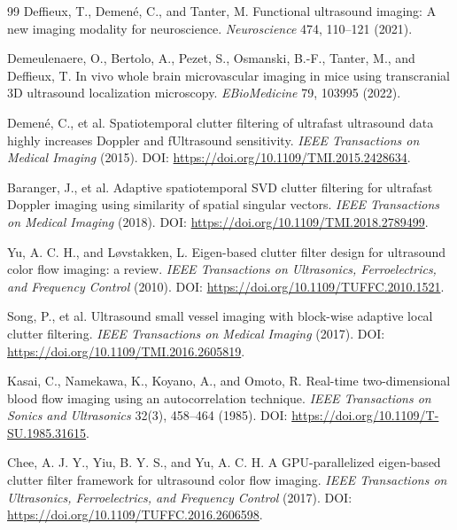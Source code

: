 \documentclass[11pt]{article}
\begin{document}
\begin{thebibliography}{99}
Deffieux, T., Demen{\'e}, C., and Tanter, M.
\newblock Functional ultrasound imaging: A new imaging modality for neuroscience.
\newblock \emph{Neuroscience} 474, 110--121 (2021).

Demeulenaere, O., Bertolo, A., Pezet, S., Osmanski, B.-F., Tanter, M., and Deffieux, T.
\newblock In vivo whole brain microvascular imaging in mice using transcranial 3D ultrasound localization microscopy.
\newblock \emph{EBioMedicine} 79, 103995 (2022).

Demen{\'e}, C., et al.
\newblock Spatiotemporal clutter filtering of ultrafast ultrasound data highly increases Doppler and fUltrasound sensitivity.
\newblock \emph{IEEE Transactions on Medical Imaging} (2015).
\newblock DOI: \url{https://doi.org/10.1109/TMI.2015.2428634}.

Baranger, J., et al.
\newblock Adaptive spatiotemporal SVD clutter filtering for ultrafast Doppler imaging using similarity of spatial singular vectors.
\newblock \emph{IEEE Transactions on Medical Imaging} (2018).
\newblock DOI: \url{https://doi.org/10.1109/TMI.2018.2789499}.

Yu, A. C. H., and L{\o}vstakken, L.
\newblock Eigen-based clutter filter design for ultrasound color flow imaging: a review.
\newblock \emph{IEEE Transactions on Ultrasonics, Ferroelectrics, and Frequency Control} (2010).
\newblock DOI: \url{https://doi.org/10.1109/TUFFC.2010.1521}.

Song, P., et al.
\newblock Ultrasound small vessel imaging with block-wise adaptive local clutter filtering.
\newblock \emph{IEEE Transactions on Medical Imaging} (2017).
\newblock DOI: \url{https://doi.org/10.1109/TMI.2016.2605819}.

Kasai, C., Namekawa, K., Koyano, A., and Omoto, R.
\newblock Real-time two-dimensional blood flow imaging using an autocorrelation technique.
\newblock \emph{IEEE Transactions on Sonics and Ultrasonics} 32(3), 458--464 (1985).
\newblock DOI: \url{https://doi.org/10.1109/T-SU.1985.31615}.

Chee, A. J. Y., Yiu, B. Y. S., and Yu, A. C. H.
\newblock A GPU-parallelized eigen-based clutter filter framework for ultrasound color flow imaging.
\newblock \emph{IEEE Transactions on Ultrasonics, Ferroelectrics, and Frequency Control} (2017).
\newblock DOI: \url{https://doi.org/10.1109/TUFFC.2016.2606598}.


\end{thebibliography}
\end{document}
